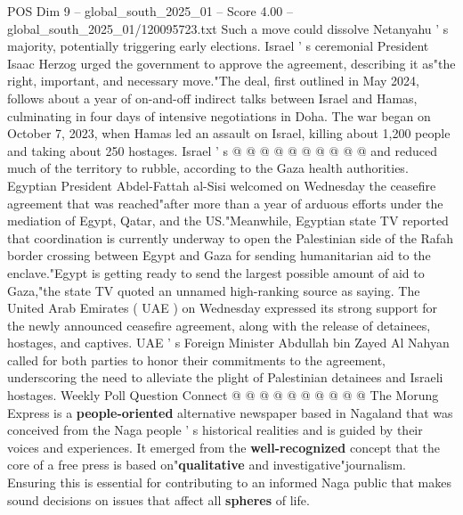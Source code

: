 \begin{textsample}{POS Dim 9 – global\_south\_2025\_01 – Score 4.00 – global\_south\_2025\_01/120095723.txt}
Such a move could dissolve Netanyahu ' s majority, potentially triggering early elections.
Israel ' s ceremonial President Isaac Herzog urged the government to approve the agreement, describing it as"the right, important, and necessary move."The deal, first outlined in May 2024, follows about a year of on-and-off indirect talks between Israel and Hamas, culminating in four days of intensive negotiations in Doha.
The war began on October 7, 2023, when Hamas led an assault on Israel, killing about 1,200 people and taking about 250 hostages.
Israel ' s @ @ @ @ @ @ @ @ @ @ and reduced much of the territory to rubble, according to the Gaza health authorities.
Egyptian President Abdel-Fattah al-Sisi welcomed on Wednesday the ceasefire agreement that was reached"after more than a year of arduous efforts under the mediation of Egypt, Qatar, and the US."Meanwhile, Egyptian state TV reported that coordination is currently underway to open the Palestinian side of the Rafah border crossing between Egypt and Gaza for sending humanitarian aid to the enclave."Egypt is getting ready to send the largest possible amount of aid to Gaza,"the state TV quoted an unnamed high-ranking source as saying.
The United Arab Emirates ( UAE ) on Wednesday expressed its strong support for the newly announced ceasefire agreement, along with the release of detainees, hostages, and captives.
UAE ' s Foreign Minister Abdullah bin Zayed Al Nahyan called for both parties to honor their commitments to the agreement, underscoring the need to alleviate the plight of Palestinian detainees and Israeli hostages.
Weekly Poll Question Connect @ @ @ @ @ @ @ @ @ @ The Morung Express is a \textbf{people-oriented} alternative newspaper based in Nagaland that was conceived from the Naga people ' s historical realities and is guided by their voices and experiences.
It emerged from the \textbf{well-recognized} concept that the core of a free press is based on"\textbf{qualitative} and investigative"journalism.
Ensuring this is essential for contributing to an informed Naga public that makes sound decisions on issues that affect all \textbf{spheres} of life.

\end{textsample}
